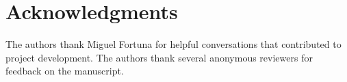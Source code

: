 
\section{Acknowledgments}
The authors thank Miguel Fortuna for helpful conversations that contributed to project development. The authors thank several anonymous reviewers for feedback on the manuscript.

